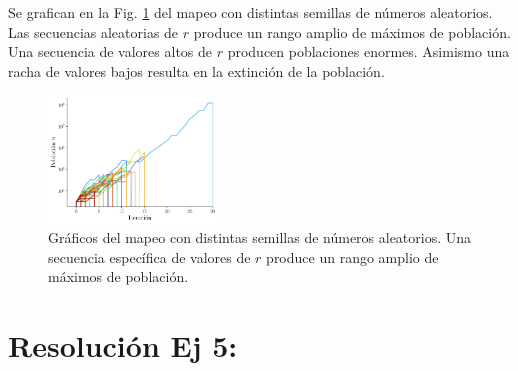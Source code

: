 \documentclass[twocolumn,aps,prl]{revtex4-1}
\begin{document}
Se grafican en la Fig. \ref{fig:scripts/ex4} del mapeo con distintas semillas de números aleatorios. Las secuencias aleatorias de $r$ produce un rango amplio de máximos de población. Una secuencia de valores altos de $r$ producen poblaciones enormes. Asimismo una racha de valores bajos resulta en la extinción de la población.

\begin{figure}[ht!]
    \centering
        \centering
        \includegraphics[width = 0.4\textwidth]{scripts/ex4.pdf}
        \caption{Gráficos del mapeo con distintas semillas de números aleatorios. Una secuencia específica de valores de $r$ produce un rango amplio de máximos de población.}
        \label{fig:scripts/ex4}
\end{figure}

% 
%                             
% 

\section{Resolución Ej 5:}
\end{document}
